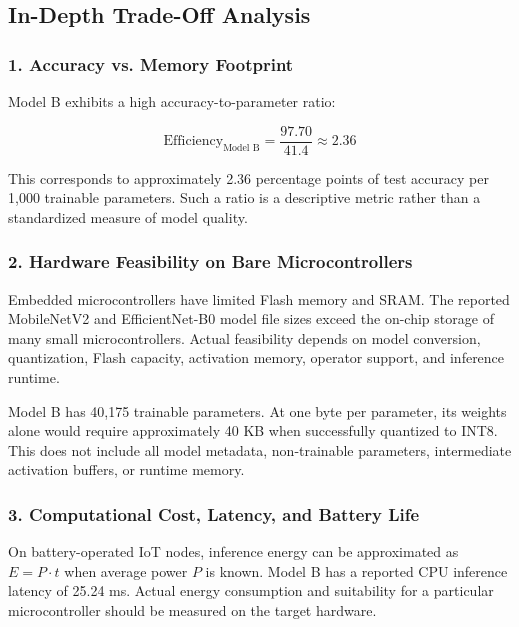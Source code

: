 \subsection{In-Depth Trade-Off Analysis}

\subsubsection{1. Accuracy vs. Memory Footprint}

Model B exhibits a high accuracy-to-parameter ratio:

\begin{equation}
    \text{Efficiency}_{\text{Model B}}
    = \frac{97.70}{41.4}
    \approx 2.36
\end{equation}

This corresponds to approximately 2.36 percentage points of test accuracy per 1,000 trainable parameters. Such a ratio is a descriptive metric rather than a standardized measure of model quality.

\subsubsection{2. Hardware Feasibility on Bare Microcontrollers}

Embedded microcontrollers have limited Flash memory and SRAM. The reported MobileNetV2 and EfficientNet-B0 model file sizes exceed the on-chip storage of many small microcontrollers. Actual feasibility depends on model conversion, quantization, Flash capacity, activation memory, operator support, and inference runtime.

Model B has 40,175 trainable parameters. At one byte per parameter, its weights alone would require approximately 40 KB when successfully quantized to INT8. This does not include all model metadata, non-trainable parameters, intermediate activation buffers, or runtime memory.

\subsubsection{3. Computational Cost, Latency, and Battery Life}

On battery-operated IoT nodes, inference energy can be approximated as $E=P\cdot t$ when average power $P$ is known. Model B has a reported CPU inference latency of 25.24 ms. Actual energy consumption and suitability for a particular microcontroller should be measured on the target hardware.

